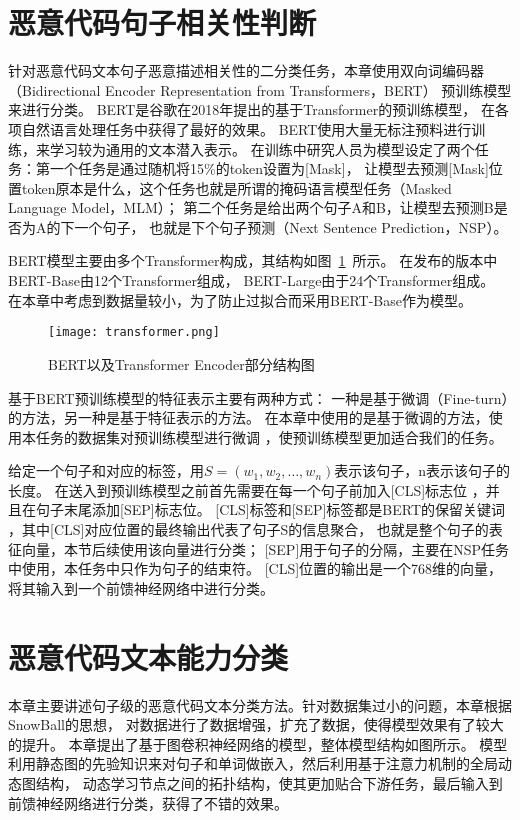 \section{恶意代码句子相关性判断}
针对恶意代码文本句子恶意描述相关性的二分类任务，本章使用双向词编码器（Bidirectional Encoder Representation from Transformers，BERT）
预训练模型来进行分类。
BERT是谷歌在2018年提出的基于Transformer的预训练模型，
在各项自然语言处理任务中获得了最好的效果。
BERT使用大量无标注预料进行训练，来学习较为通用的文本潜入表示。
在训练中研究人员为模型设定了两个任务：第一个任务是通过随机将15\%的token设置为[Mask]，
让模型去预测[Mask]位置token原本是什么，这个任务也就是所谓的掩码语言模型任务（Masked Language Model，MLM）；
第二个任务是给出两个句子A和B，让模型去预测B是否为A的下一个句子，
也就是下个句子预测（Next Sentence Prediction，NSP）。

BERT模型主要由多个Transformer构成，其结构如图~\ref{fig:transformer}~所示。
在发布的版本中BERT-Base由12个Transformer组成，
BERT-Large由于24个Transformer组成。
在本章中考虑到数据量较小，为了防止过拟合而采用BERT-Base作为模型。
\begin{figure}[htb]
	\centering
	\texttt{[image: transformer.png]}
	\caption{BERT以及Transformer Encoder部分结构图}
	\label{fig:transformer}
\end{figure}




基于BERT预训练模型的特征表示主要有两种方式：
一种是基于微调（Fine-turn）的方法，另一种是基于特征表示的方法。
在本章中使用的是基于微调的方法，使用本任务的数据集对预训练模型进行微调
，使预训练模型更加适合我们的任务。

给定一个句子和对应的标签，用$S=(w_1,w_2,…,w_n)$表示该句子，n表示该句子的长度。
在送入到预训练模型之前首先需要在每一个句子前加入[CLS]标志位
，并且在句子末尾添加[SEP]标志位。
[CLS]标签和[SEP]标签都是BERT的保留关键词
，其中[CLS]对应位置的最终输出代表了句子S的信息聚合，
也就是整个句子的表征向量，本节后续使用该向量进行分类；
[SEP]用于句子的分隔，主要在NSP任务中使用，本任务中只作为句子的结束符。
[CLS]位置的输出是一个768维的向量，将其输入到一个前馈神经网络中进行分类。


\section{恶意代码文本能力分类}
本章主要讲述句子级的恶意代码文本分类方法。针对数据集过小的问题，本章根据SnowBall的思想，
对数据进行了数据增强，扩充了数据，使得模型效果有了较大的提升。
本章提出了基于图卷积神经网络的模型，整体模型结构如图所示。
模型利用静态图的先验知识来对句子和单词做嵌入，然后利用基于注意力机制的全局动态图结构，
动态学习节点之间的拓扑结构，使其更加贴合下游任务，最后输入到前馈神经网络进行分类，获得了不错的效果。

